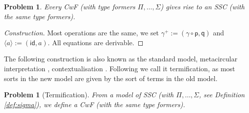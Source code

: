\documentclass[submission,copyright,creativecommons]{eptcs}
\newtheorem{problem}[theorem]{Problem}
\newcommand{\p}{\mathsf{p}}
\newcommand{\q}{\mathsf{q}}
\newcommand{\id}{\mathsf{id}}
\begin{document}
\begin{problem}
  Every CwF (with type formers $\Pi, \dots, \Sigma$) gives rise to an SSC (with
  the same type formers).
\end{problem}
\begin{proof}[Construction]
  Most operations are the same, we set $\gamma^+ :=
  (\gamma\circ\p,\q)$ and $\langle a\rangle := (\id,a)$. All equations are derivable.
\end{proof}
The following construction is also known as the standard model,
metacircular interpretation \cite{DBLP:conf/popl/AltenkirchK16},
contextualisation \cite{DBLP:conf/fscd/BocquetKS23}. Following
\cite{DBLP:conf/mpc/KaposiKK19} we call it termification, as most sorts in the
new model are given by the sort of terms in the old model.
\begin{problem}[Termification]\label{prob:termification}
  From a model of SSC (with $\Pi, \dots, \Sigma$, see Definition
  \ref{def:sigma}), we define a CwF (with the same type formers).
\end{problem}
\end{document}
